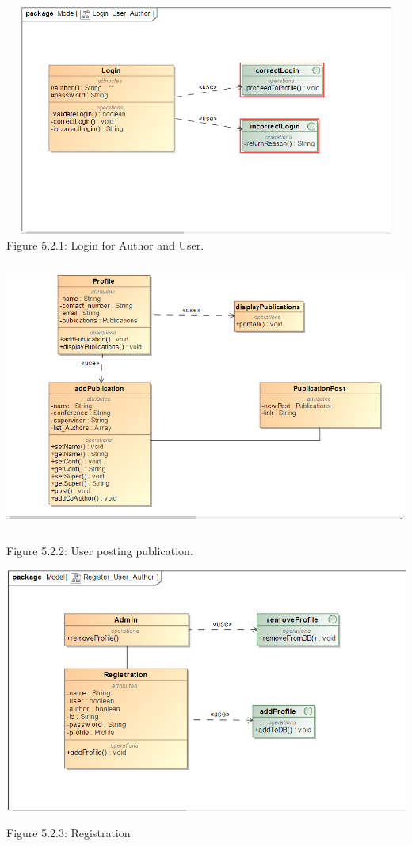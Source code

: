 \documentclass{article} %
\begin{document}
	\noindent \includegraphics*[width=5.45in, height=2.99in, keepaspectratio=false, trim=2.79in 1.09in 0.58in 0.88in]{Login.png}
	Figure 5.2.1: Login for Author and User.
	
	\noindent \includegraphics*[width=5.62in, height=3.48in, keepaspectratio=false, trim=2.71in 0.53in 0.21in 0.79in]{Posting.png}
	
	Figure 5.2.2: User posting publication.
	\noindent \includegraphics*[width=6.01in, height=3.46in, keepaspectratio=false, trim=2.97in 0.82in 0.27in 0.92in]{Registration.png}
	Figure 5.2.3: Registration
	
	
\end{document}
